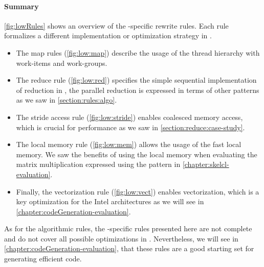 \paragraph{Summary}
\autoref{fig:lowRules} shows an overview of the \OpenCL-specific rewrite rules.
Each rule formalizes a different implementation or optimization strategy in \OpenCL.

\begin{itemize}
  \item The map rules (\autoref{fig:low:map}) describe the usage of the \OpenCL thread hierarchy with work-items and work-groups.

  \item The reduce rule (\autoref{fig:low:red}) specifies the simple sequential implementation of reduction in \OpenCL, the parallel reduction is expressed in terms of other patterns as we saw in \autoref{section:rules:algo}.

  \item The stride access rule (\autoref{fig:low:stride}) enables coalesced memory access, which is crucial for performance as we saw in \autoref{section:reduce:case-study}.

  \item The local memory rule (\autoref{fig:low:mem}) allows the usage of the fast local memory.
  We saw the benefits of using the local memory when evaluating the matrix multiplication expressed using the \allpairs pattern in \autoref{chapter:skelcl-evaluation}.

  \item Finally, the vectorization rule (\autoref{fig:low:vect}) enables vectorization, which is a key optimization for the Intel \CPU architectures as we will see in \autoref{chapter:codeGeneration-evaluation}.
\end{itemize}

As for the algorithmic rules, the \OpenCL-specific rules presented here are not complete and do not cover all possible optimizations in \OpenCL.
Nevertheless, we will see in \autoref{chapter:codeGeneration-evaluation}, that these rules are a good starting set for generating efficient \OpenCL code.

